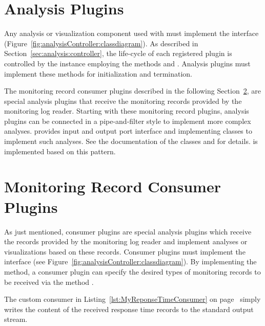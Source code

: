 
\setJavaCodeListing


\section{Analysis Plugins}\label{sec:analysis:plugins}

Any analysis or visualization component used with \KiekerAnalysisPart{} must %
implement the interface  (Figure~\ref{fig:analysisController:classdiagram}). %
As described in Section~\ref{sec:analysis:controller}, the life-cycle of each %
registered plugin is controlled by the  instance %
employing the methods  and . Analysis plugins %
must implement these methods for initialization and termination.

The monitoring record consumer plugins described in the following %
Section~\ref{sec:analysis:consumer}, are special analysis plugins that receive %
the monitoring records provided by the monitoring log reader. %
Starting with these monitoring record plugins, analysis plugins can be connected %
in a pipe-and-filter style to implement more complex analyses. %
\Kieker{} provides input and output port interface and implementing classes %
to implement such analyses. See the documentation of the classes  %
and  for details. \KiekerTraceAnalysis{} is implemented %
based on this pattern. 

\section{Monitoring Record Consumer Plugins}\label{sec:analysis:consumer}

As just mentioned, consumer plugins are special analysis plugins which receive %
the records provided by the monitoring log reader and implement analyses or %
visualizations based on these records. %
Consumer plugins must implement the interface  %
(see Figure~\ref{fig:analysisController:classdiagram}). %
By implementing the  method, a consumer plugin %
can specify the desired types of monitoring records to be received via the %
method .

The custom consumer in Listing~\ref{lst:MyReponseTimeConsumer} on %
page~\pageref{lst:MyReponseTimeConsumer} simply writes %
the content of the received response time records to the standard output stream.

\pagebreak

\setJavaCodeListing


